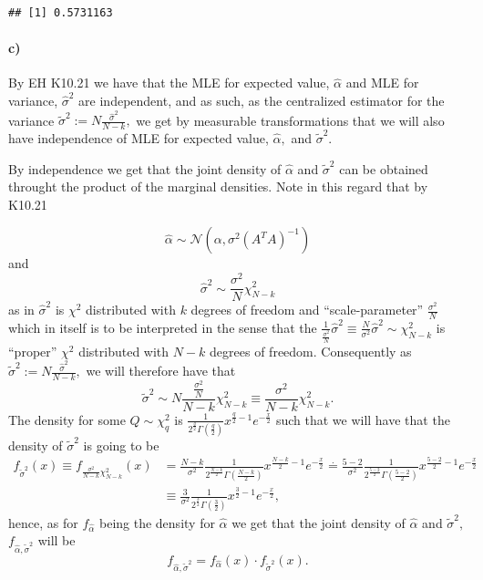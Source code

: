 \documentclass[
]{article}
\begin{document}
\begin{verbatim}
## [1] 0.5731163
\end{verbatim}

\hypertarget{c}{%
\paragraph{\texorpdfstring{\textbf{c)}}{c)}}\label{c}}

By EH K10.21 we have that the MLE for expected value, \(\hat\alpha\) and
MLE for variance, \(\hat\sigma^2\) are independent, and as such, as the
centralized estimator for the variance
\(\tilde{\sigma}^2:=N\frac{\hat\sigma^2}{N-k},\) we get by measurable
transformations that we will also have independence of MLE for expected
value, \(\hat\alpha,\) and \(\tilde\sigma^2.\)

By independence we get that the joint density of \(\hat\alpha\) and
\(\tilde\sigma^2\) can be obtained throught the product of the marginal
densities. Note in this regard that by K10.21

\[
\hat\alpha\sim\mathcal{N}(\alpha,\sigma^2\left({A^TA}\right)^{-1})
\] and \[
\hat\sigma^2\sim\frac{\sigma^2}{N}\chi^2_{N-k}
\] as in \(\hat\sigma^2\) is \(\chi^2\) distributed with \(k\) degrees
of freedom and ``scale-parameter'' \(\frac{\sigma^2}{N}\) which in
itself is to be interpreted in the sense that the
\(\frac{1}{\frac{\sigma^2}{N}}\hat\sigma^2\equiv\frac{N}{\sigma^2}\hat\sigma^2\sim\chi^2_{N-k}\)
is ``proper'' \(\chi^2\) distributed with \(N-k\) degrees of freedom.
Consequently as \(\tilde{\sigma}^2:=N\frac{\hat\sigma^2}{N-k},\) we will
therefore have that \[
\tilde\sigma^2\sim N\frac{\frac{\sigma^2}{N}}{N-k}\chi^2_{N-k}\equiv\frac{\sigma^2}{N-k}\chi^2_{N-k}.
\] The density for some \(Q\sim\chi_q^2\) is
\(\frac{1}{2^{\frac{q}{2}}\Gamma(\frac{q}{2})}x^{\frac{q}{2}-1}e^{-\frac{x}{2}}\)
such that we will have that the density of \(\tilde\sigma^2\) is going
to be \begin{align*}
f_{\tilde\sigma^2}(x)\equiv f_{\frac{\sigma^2}{N-k}\chi_{N-k}^2}(x)&=\frac{N-k}{\sigma^2}\frac{1}{2^{\frac{N-k}{2}}\Gamma(\frac{N-k}{2})}x^{\frac{N-k}{2}-1}e^{-\frac{x}{2}}\overset{\cdot}{=}\frac{5-2}{\sigma^2}\frac{1}{2^{\frac{5-2}{2}}\Gamma(\frac{5-2}{2})}x^{\frac{5-2}{2}-1}e^{-\frac{x}{2}}\\
&\equiv \frac{3}{\sigma^2}\frac{1}{2^{\frac{3}{2}}\Gamma(\frac{3}{2})}x^{\frac{3}{2}-1}e^{-\frac{x}{2}},
\end{align*} hence, as for \(f_{\hat\alpha}\) being the density for
\(\hat\alpha\) we get that the joint density of \(\hat\alpha\) and
\(\tilde\sigma^2,\) \(f_{\hat\alpha,\tilde\sigma^2}\) will be \[
f_{\hat\alpha,\tilde\sigma^2}=f_{\hat\alpha}(x)\cdot f_{\tilde\sigma^2}(x).
\]
\end{document}
